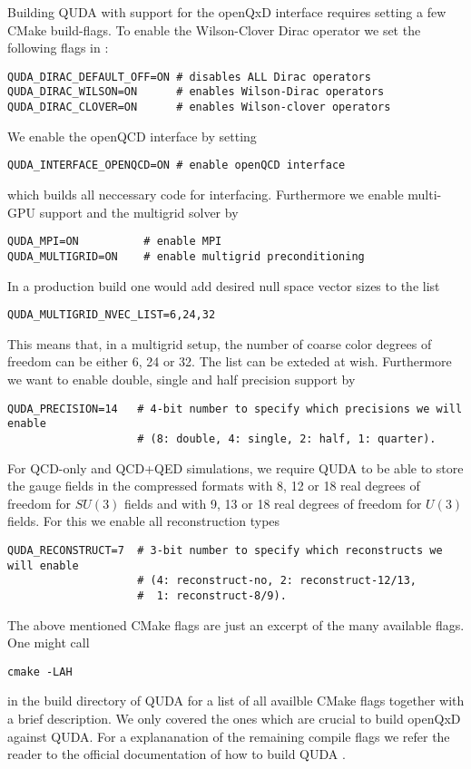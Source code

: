 Building QUDA with support for the openQxD interface requires setting a few CMake build-flags. To enable the Wilson-Clover Dirac operator we set the following flags in  \cite{QUDApaper}:
\begin{verbatim}
QUDA_DIRAC_DEFAULT_OFF=ON # disables ALL Dirac operators
QUDA_DIRAC_WILSON=ON      # enables Wilson-Dirac operators
QUDA_DIRAC_CLOVER=ON      # enables Wilson-clover operators
\end{verbatim}
We enable the openQCD interface by setting
\begin{verbatim}
QUDA_INTERFACE_OPENQCD=ON # enable openQCD interface
\end{verbatim}
which builds all neccessary code for interfacing. Furthermore we enable multi-GPU support and the multigrid solver by
\begin{verbatim}
QUDA_MPI=ON          # enable MPI
QUDA_MULTIGRID=ON    # enable multigrid preconditioning
\end{verbatim}
In a production build one would add desired null space vector sizes to the list
\begin{verbatim}
QUDA_MULTIGRID_NVEC_LIST=6,24,32
\end{verbatim}
This means that, in a multigrid setup, the number of coarse color degrees of freedom can be either 6, 24 or 32. The list can be exteded at wish. Furthermore we want to enable double, single and half precision support by
\begin{verbatim}
QUDA_PRECISION=14   # 4-bit number to specify which precisions we will enable
                    # (8: double, 4: single, 2: half, 1: quarter).
\end{verbatim}
For QCD-only and QCD+QED simulations, we require QUDA to be able to store the gauge fields in the compressed formats with 8, 12 or 18 real degrees of freedom for $SU(3)$ fields and with 9, 13 or 18 real degrees of freedom for $U(3)$ fields. For this we enable all reconstruction types
\begin{verbatim}
QUDA_RECONSTRUCT=7  # 3-bit number to specify which reconstructs we will enable
                    # (4: reconstruct-no, 2: reconstruct-12/13, 
                    #  1: reconstruct-8/9).
\end{verbatim}
The above mentioned CMake flags are just an excerpt of the many available flags. One might call
\begin{verbatim}
cmake -LAH
\end{verbatim}
in the build directory of QUDA for a list of all availble CMake flags together with a brief description. We only covered the ones which are crucial to build openQxD against QUDA. For a explananation of the remaining compile flags we refer the reader to the official documentation of how to build QUDA \cite{github:quda}.

